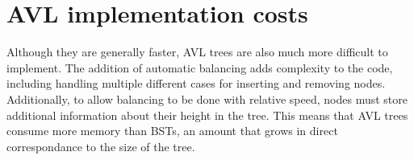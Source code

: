 \documentclass{article} %
\begin{document}
\section{AVL implementation costs}
Although they are generally faster, AVL trees are also much more difficult to implement. The addition of automatic balancing adds complexity to the code, including handling multiple different cases for inserting and removing nodes. Additionally, to allow balancing to be done with relative speed, nodes must store additional information about their height in the tree. This means that AVL trees consume more memory than BSTs, an amount that grows in direct correspondance to the size of the tree.
\end{document}

